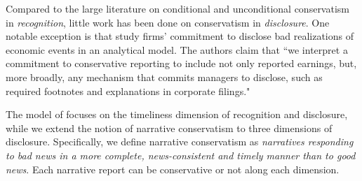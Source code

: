 \documentclass[letterpaper,11pt]{article}
\begin{document}
\begin{spacing}{1.5}
Compared to the large literature on conditional and unconditional conservatism in \textit{recognition}, little work has been done on conservatism in \textit{disclosure}. One notable exception is  that study firms' commitment to disclose bad realizations of economic events in an analytical model. The authors claim that ``we interpret a commitment to conservative reporting to include not only reported earnings, but, more broadly, any mechanism that commits managers to disclose, such as required footnotes and explanations in corporate filings." \cite[p. 73]{guayConservativeDisclosure2018}
\begin{comment}
	As \citeA[p. 243]{kothariManagersWithholdBad2009} state:
	\begin{adjustwidth}{1cm}{1cm}
	\begin{singlespace}
	\textit{Considerable research examines conservative} recognition \textit{in accounting in the United States and internationally (Basu [1997], Ball, Kothari, and Robin [2000], McNichols [1988]). However, there is little systematic evidence to suggest conservatism in firms’} disclosure \textit{practices, with the notable exception of disclosure of bad news to mitigate litigation risk.}
	\end{singlespace}
	\end{adjustwidth}
	In a recent analytical work, \citeA[pp. 73-74]{guayConservativeDisclosure2018} have expressed similar opinions:
	\begin{adjustwidth}{1cm}{1cm}
	\begin{singlespace}
	\textit{By way of an analogy, 20 years ago, much of the accounting literature on transparent financial disclosure emphasized constructs such as earnings timeliness, high-quality accruals, and asset/liability recognition. Today, scholars study a plethora of additional financial disclosure mechanisms, including management forecasts, conference calls, management discussion and analysis (MD\&A) disclosure, press releases, and social media outlets. A commitment to timely disclosure of bad news need not come exclusively through financial statement recognition, and we believe that a broader view of conservative disclosure will offer new paths forward for a literature that has struggled to develop theories to explain the efficiency of timely asymmetric earnings numbers. We encourage researchers to pursue these avenues to better understand how the very large literature on conservative financial reporting integrates with the equally large literature on corporate disclosure.}
	\end{singlespace}
	\end{adjustwidth}
\end{comment}
The model of  focuses on the timeliness dimension of recognition and disclosure, while we extend the notion of narrative conservatism to three dimensions of disclosure. Specifically, we define narrative conservatism as \textit{narratives responding to bad news in a more complete, news-consistent and timely manner than to good news}. Each narrative report can be conservative or not along each dimension.


\end{spacing}
\end{document}
